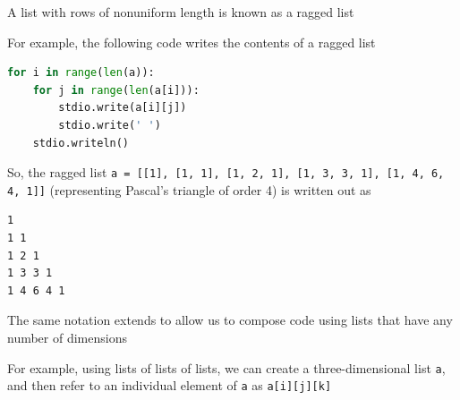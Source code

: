 \documentclass[8pt,a4paper,compress]{beamer}
\begin{document}
\begin{frame}[fragile]
\pause

A list with rows of nonuniform length is known as a ragged list

\pause\bigskip

For example, the following code writes the contents of a ragged list

\smallskip

\begin{lstlisting}[language=Python,style=focusin]
for i in range(len(a)):
    for j in range(len(a[i])):
        stdio.write(a[i][j])
        stdio.write(' ')
    stdio.writeln()
\end{lstlisting}

\smallskip

So, the ragged list \lstinline{a = [[1], [1, 1], [1, 2, 1], [1, 3, 3, 1], [1, 4, 6, 4, 1]]} (representing Pascal's triangle of order 4) is written out as

\smallskip

\begin{lstlisting}[language={},style=focusin]
1
1 1
1 2 1
1 3 3 1
1 4 6 4 1
\end{lstlisting}

\pause\bigskip

The same notation extends to allow us to compose code using lists that have any number of dimensions

\pause\bigskip

For example, using lists of lists of lists, we can create a three-dimensional list \lstinline{a}, and then refer to an individual element of \lstinline{a} as \lstinline{a[i][j][k]}
\end{frame}
\end{document}
